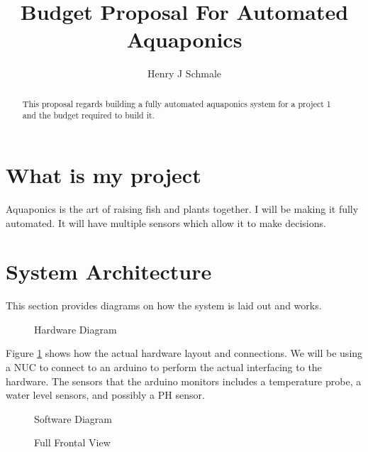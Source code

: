 \documentclass[12pt]{article}
\title{Budget Proposal For Automated Aquaponics}
\author{Henry J Schmale}
\begin{document}
\maketitle

\begin{abstract}
This proposal regards building a fully automated aquaponics system
for a project 1 and the budget required to build it.
\end{abstract}

\section{What is my project}
Aquaponics is the art of raising fish and plants together.
I will be making it fully automated. It will have multiple sensors
which allow it to make decisions.

\section{System Architecture}
This section provides diagrams on how the system is laid out 
and works.

\begin{figure}
	\hspace{3.5in}
	\caption{Hardware Diagram}
	\label{fig:hardware}
\end{figure}

Figure \ref{fig:hardware} shows how the actual hardware layout and connections. We will be using a NUC to connect to an arduino to perform the actual interfacing to the hardware. The sensors that the arduino monitors includes a temperature probe, a water level sensors,
and possibly a PH sensor.

\begin{figure}
	\hspace{3.5in}
	\caption{Software Diagram}
	\label{fig:software}
\end{figure}




\begin{figure}
	\hspace{3.5in}
	\caption{Full Frontal View}
	\label{fig:front-view}
\end{figure}
\end{document}
